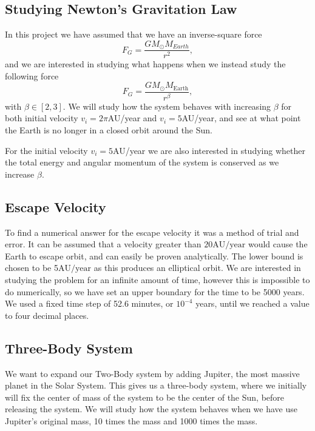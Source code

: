 \documentclass[%
reprint,
nofootinbib,
amsmath,amssymb,
aps,
]{revtex4-1}
\begin{document}
\subsection{Studying Newton's Gravitation Law}%
In this project we have assumed that we have an inverse-square force 
\begin{equation}
	F_G = \frac{GM_{\odot}M_{Earth}}{r^2},
\end{equation}
and we are interested in studying what happens when we instead study the following force 
\begin{equation}
	F_G = \frac{GM_{\odot}M_{\text{Earth}}}{r^{\beta}},
\end{equation}
with $\beta \in [2,3]$. We will study how the system behaves with increasing $\beta$ for both initial velocity $v_i = 2\pi$AU/year and $v_i = 5$AU/year, and see at what point the Earth is no longer in a closed orbit around the Sun. 

For the initial velocity $v_i = 5$AU/year we are also interested in studying whether the total energy and angular momentum of the system is conserved as we increase $\beta.$ 

\subsection{Escape Velocity}%
To find a numerical answer for the escape velocity it was a method of trial and error. It can be assumed that a velocity greater than $20\text{AU}/\text{year}$ would cause the Earth to escape orbit, and can easily be proven analytically. The lower bound is chosen to be 5$\text{AU}/\text{year}$ as this produces an elliptical orbit. We are interested in studying the problem for an infinite amount of time, however this is impossible to do numerically, so we have set an upper boundary for the time to be 5000 years. We used a fixed time step of 52.6 minutes, or $10^{-4}$ years, until we reached a value to four decimal places.
\subsection{Three-Body System}%
We want to expand our Two-Body system by adding Jupiter, the most massive planet in the Solar System. This gives us a three-body system, where we initially will fix the center of mass of the system to be the center of the Sun, before releasing the system. We will study how the system behaves when we have use Jupiter's original mass, 10 times the mass and 1000 times the mass. 
\end{document}
